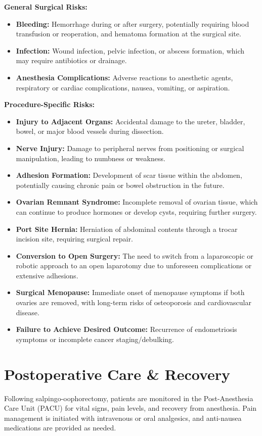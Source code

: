 \textbf{General Surgical Risks:}
\begin{itemize}
  \item \textbf{Bleeding:} Hemorrhage during or after surgery, potentially requiring blood transfusion or reoperation, and hematoma formation at the surgical site.
  \item \textbf{Infection:} Wound infection, pelvic infection, or abscess formation, which may require antibiotics or drainage.
  \item \textbf{Anesthesia Complications:} Adverse reactions to anesthetic agents, respiratory or cardiac complications, nausea, vomiting, or aspiration.
\end{itemize}

\textbf{Procedure-Specific Risks:}
\begin{itemize}
  \item \textbf{Injury to Adjacent Organs:} Accidental damage to the ureter, bladder, bowel, or major blood vessels during dissection.
  \item \textbf{Nerve Injury:} Damage to peripheral nerves from positioning or surgical manipulation, leading to numbness or weakness.
  \item \textbf{Adhesion Formation:} Development of scar tissue within the abdomen, potentially causing chronic pain or bowel obstruction in the future.
  \item \textbf{Ovarian Remnant Syndrome:} Incomplete removal of ovarian tissue, which can continue to produce hormones or develop cysts, requiring further surgery.
  \item \textbf{Port Site Hernia:} Herniation of abdominal contents through a trocar incision site, requiring surgical repair.
  \item \textbf{Conversion to Open Surgery:} The need to switch from a laparoscopic or robotic approach to an open laparotomy due to unforeseen complications or extensive adhesions.
  \item \textbf{Surgical Menopause:} Immediate onset of menopause symptoms if both ovaries are removed, with long-term risks of osteoporosis and cardiovascular disease.
  \item \textbf{Failure to Achieve Desired Outcome:} Recurrence of endometriosis symptoms or incomplete cancer staging/debulking.
\end{itemize}

\section*{Postoperative Care \& Recovery}
Following salpingo-oophorectomy, patients are monitored in the Post-Anesthesia Care Unit (PACU) for vital signs, pain levels, and recovery from anesthesia. Pain management is initiated with intravenous or oral analgesics, and anti-nausea medications are provided as needed.

